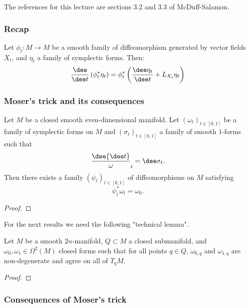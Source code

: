 The references for this lecture are sections 3.2 and 3.3 of McDuff-Salamon.
\subsubsection*{Recap}


\begin{thm*}
    Let $\phi_t:M\to M$ be a smooth family of diffeomorphism generated by vector fields $X_t$, and $\eta_t$ a family of symplectic forms.
    Then:
    \[\frac{\dee}{\dee t}\left(\phi_t^*\eta_t\right)=\phi_t^*\left(\frac{\dee\eta_t}{\dee t}+L_{X_t}\eta_t\right)\]
\end{thm*}

\subsubsection*{Moser's trick and its consequences}
\begin{thm}
    Let $M$ be a closed smooth even-dimensional manifold.
    Let $(\omega_t)_{t\in[0,1]}$ be a family of symplectic forms on $M$ and $(\sigma_t)_{t\in[0,1]}$ a family of smooth $1$-forms such that
    \[\frac\dee{\dee t}\omega_t=\dee\sigma_t.\]
    Then there exists a family $(\psi_t)_{t\in[0,1]}$ of diffeomorphisms on $M$ satisfying
    \[\psi_t^*\omega_t=\omega_0.\]
\end{thm}

\begin{proof}
\end{proof}

For the next results we need the following "technical lemma".
\begin{lem}
    Let $M$ be a smooth $2n$-manifold, $Q\subset M$ a closed submanifold, and $\omega_0,\omega_1\in\Omega^2(M)$ closed forms such that for all points $q\in Q$, $\omega_{0,q}$ and $\omega_{1,q}$ are non-degenerate and agree on all of $T_qM$.
\end{lem}

\begin{proof}
\end{proof}


\subsubsection*{Consequences of Moser's trick}

